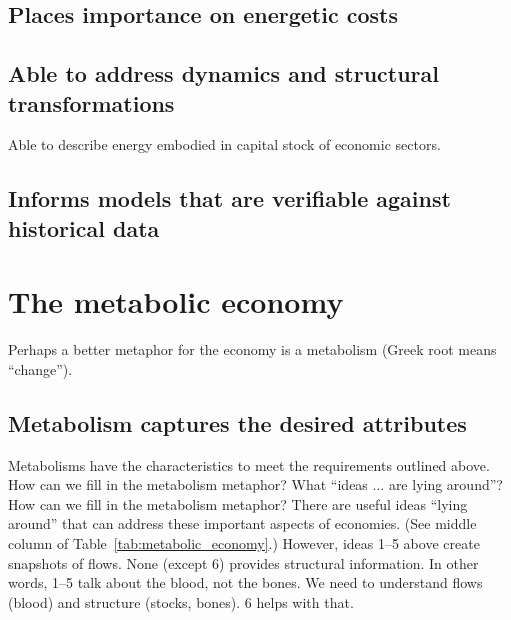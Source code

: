\subsection{Places importance on energetic costs}
\label{sec:importance_of_energy}

\subsection{Able to address dynamics and structural transformations}
\label{sec:structure}

Able to describe energy embodied in capital stock of economic sectors.

\subsection{Informs models that are verifiable against historical data}
\label{sec:verifiable}

\section{The metabolic economy}
\label{sec:metabolic_economy}

Perhaps a better metaphor for the economy is a metabolism (Greek root means ``change''). 

\subsection{Metabolism captures the desired attributes}
\label{sec:metabolism_works}
     
Metabolisms have the characteristics to meet the requirements outlined above.
How can we fill in the metabolism metaphor? What ``ideas ... are lying around''?
How can we fill in the metabolism metaphor? 
There are useful ideas ``lying around'' that can address these important aspects of economies. 
(See middle column of Table~\ref{tab:metabolic_economy}.) 
However, ideas 1–5 above create snapshots of flows. 
None (except 6) provides structural information. 
In other words, 1–5 talk about the blood, not the bones. 
We need to understand flows (blood) and structure (stocks, bones). 
6 helps with that.

